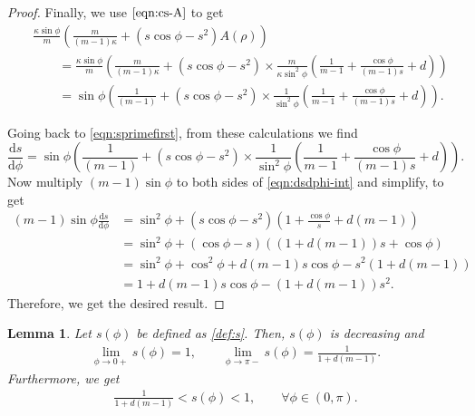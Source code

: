 \documentclass[11pt]{amsart}
\newtheorem{lemma}{Lemma}[section]
\def\d{\mathrm{d}}
\newcommand{\dm}{d} %
\begin{document}
\begin{proof}
Finally, we use $\eqref{eqn:cs-A}$ to get
\begin{align*}
&\frac{\kappa \sin\phi}{m}\left(\frac{m}{(m-1)\kappa}+(s\cos\phi-s^2)A(\rho)\right) \\
&\qquad = \frac{\kappa \sin\phi}{m}\left(\frac{m}{(m-1)\kappa}+(s\cos\phi-s^2)\times \frac{m}{\kappa\sin^2\phi}\left(\frac{1}{m-1}+\frac{\cos\phi}{(m-1)s}+\dm\right)\right)\\
&\qquad =\sin\phi\left(\frac{1}{(m-1)}+(s\cos\phi-s^2)\times \frac{1}{\sin^2\phi}\left(\frac{1}{m-1}+\frac{\cos\phi}{(m-1)s}+\dm\right)\right).
\end{align*}

Going back to \eqref{eqn:sprimefirst}, from these calculations we find
\begin{equation}
\label{eqn:dsdphi-int}
\frac{\d s}{\d\phi}=\sin\phi\left(\frac{1}{(m-1)}+(s\cos\phi-s^2)\times \frac{1}{\sin^2\phi}\left(\frac{1}{m-1}+\frac{\cos\phi}{(m-1)s}+\dm\right)\right).
\end{equation}
Now multiply $(m-1)\sin\phi$ to both sides of \eqref{eqn:dsdphi-int} and simplify, to get
\begin{align*}
(m-1)\sin\phi\frac{\d s}{\d\phi}&=\sin^2\phi+(s\cos\phi-s^2)\left(1+\frac{\cos\phi}{s}+\dm(m-1)\right)\\
&=\sin^2\phi+(\cos\phi-s)((1+\dm(m-1))s+\cos\phi)\\
&=\sin^2\phi+\cos^2\phi+\dm(m-1)s\cos\phi-s^2(1+\dm(m-1))\\
&=1+\dm(m-1)s \cos\phi-(1+\dm(m-1))s^2.
\end{align*}
Therefore, we get the desired result.
\end{proof}

\begin{lemma}\label{lem:svd}
Let $s(\phi)$ be defined as \eqref{def:s}. Then, $s(\phi)$ is decreasing and
\begin{align}\label{slimvalue}
\lim_{\phi\to0+}s(\phi)=1,\qquad\lim_{\phi\to\pi-}s(\phi)=\frac{1}{1+\dm(m-1)}.
\end{align}
Furthermore, we get
\begin{align}\label{srange}
\frac{1}{1+\dm(m-1)}< s(\phi)< 1, \qquad\forall\phi\in(0, \pi).
\end{align}
\end{lemma}
\end{document}
